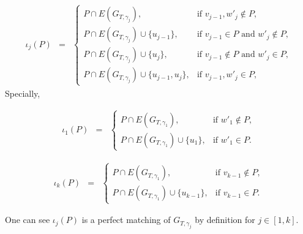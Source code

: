 \documentclass[10pt]{amsart}
\theoremstyle{theorems}
\begin{document}
 \[\begin{array}{ccl} \iota_j(P) &=&

         \left\{\begin{array}{ll}

             P\cap E(G_{T,\gamma_j}), &\mbox{if $v_{j-1},w'_{j}\notin P$}, \\

             P\cap E(G_{T,\gamma_j})\cup\{u_{j-1}\}, &\mbox{if $v_{j-1}\in P$ and $w'_{j}\notin P$}, \\

             P\cap E(G_{T,\gamma_j})\cup\{u_{j}\}, &\mbox{if $v_{j-1}\notin P$ and $w'_{j}\in P$}, \\

             P\cap E(G_{T,\gamma_j})\cup\{u_{j-1},u_j\}, &\mbox{if $v_{j-1},w'_{j}\in P$},

         \end{array}\right.

 \end{array}\]
Specially,

 \[\begin{array}{ccl} \iota_1(P) &=&

         \left\{\begin{array}{ll}

             P\cap E(G_{T,\gamma_1}), &\mbox{if $w'_{1}\notin P$}, \\

             P\cap E(G_{T,\gamma_1})\cup\{u_1\}, &\mbox{if $w'_{1}\in P$}.

         \end{array}\right.

 \end{array}\]

 \[\begin{array}{ccl} \iota_k(P) &=&

         \left\{\begin{array}{ll}

             P\cap E(G_{T,\gamma_1}), &\mbox{if $v_{k-1}\notin P$}, \\

             P\cap E(G_{T,\gamma_1})\cup\{u_{k-1}\}, &\mbox{if $v_{k-1}\in P$}.

         \end{array}\right.

 \end{array}\]

One can see $\iota_j(P)$ is a perfect matching of $G_{T,\gamma_j}$ by definition for $j\in [1, k]$.
\end{document}

